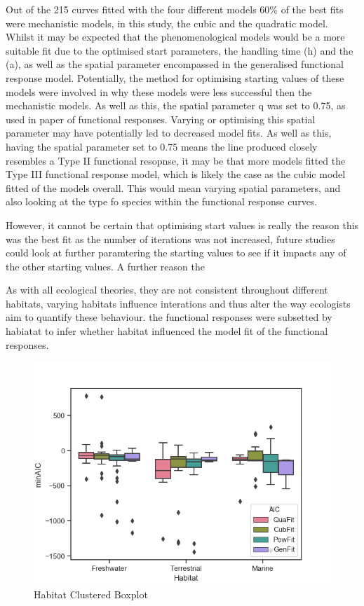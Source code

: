 \documentclass[11pt]{article}
\begin{document}
Out of the 215 curves fitted with the four different models 60\% of the best fits were mechanistic models, in this study, the cubic and the quadratic model. Whilst it may be expected that the phenomenological models would be a more suitable fit due  to the optimised start parameters, the handling time (h) and the            (a), as well as the spatial parameter encompassed in the generalised functional response model. Potentially, the method for optimising starting values of these models were involved in why these models were less successful then the mechanistic models. As well as this, the spatial parameter q was set to 0.75, as used in \cite{Pawar2012} paper of functional responses. Varying or optimising this spatial parameter may have potentially led to decreased model fits. As well as this, having the spatial parameter set to 0.75 means the line produced closely resembles a Type II functional resopnse, it may be that more models fitted the Type III functional response model, which is likely the case as the cubic model fitted           of the models overall. This would mean varying spatial parameters, and also looking at the type fo species within the functional response curves. 


However, it cannot be certain that optimising start values is really the reason this was the best fit as the number of iterations was not increased, future studies could look at further paramtering the starting values to see if it impacts any of the other starting values. A further reason the 

As with all ecological theories, they are not consistent throughout different habitats, varying habitats influence interations and thus alter the way ecologists aim to quantify these behaviour. the functional responses were subsetted by habiatat to infer whether habitat influenced the model fit of the functional responses. 

\begin{figure}[h!]
	
	\includegraphics[]{HabitatCompare.png}
	\caption{Habitat Clustered Boxplot}
	\label{Habitat Clustered Boxplot}
	
\end{figure}
\end{document}
